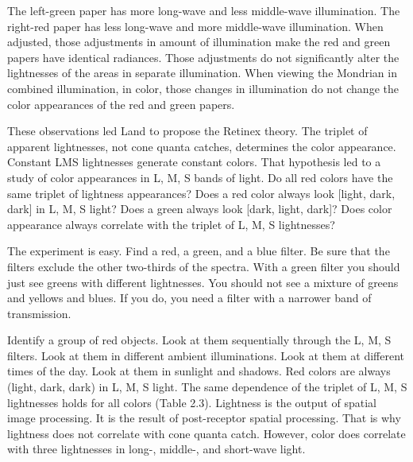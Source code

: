 The left-green paper has more long-wave and less middle-wave illumination. The right-red paper has less long-wave and more middle-wave illumination. When adjusted, those adjustments in amount of illumination make the red and green papers have identical radiances. Those adjustments do not significantly alter the lightnesses of the areas in separate illumination. When viewing the Mondrian in combined illumination, in color, those changes in illumination do not change the color appearances of the red and green papers.


These observations led Land to propose the Retinex theory. The triplet of apparent lightnesses, not cone quanta catches, determines the color appearance. Constant LMS lightnesses generate constant colors. That hypothesis led to a study of color appearances in L, M, S bands of light. Do all red colors have the same triplet of lightness appearances? Does a red color always look [light, dark, dark] in L, M, S light? Does a green always look [dark, light, dark]? Does color appearance always correlate with the triplet of L, M, S lightnesses?

The experiment is easy. Find a red, a green, and a blue filter. Be sure that the filters exclude the other two-thirds of the spectra. With a green filter you should just see greens with different lightnesses. You should not see a mixture of greens and yellows and blues. If you do, you need a filter with a narrower band of transmission.

Identify a group of red objects. Look at them sequentially through the L, M, S filters. Look at them in different ambient illuminations. Look at them at different times of the day. Look at them in sunlight and shadows. Red colors are always (light, dark, dark) in L, M, S light. The same dependence of the triplet of L, M, S lightnesses holds for all colors (Table 2.3). Lightness is the output of spatial image processing. It is the result of post-receptor spatial processing. That is why lightness does not correlate with cone quanta catch. However, color does correlate with three lightnesses in long-, middle-, and short-wave light.


